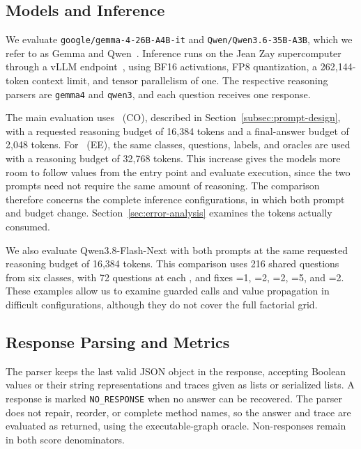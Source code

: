 \subsection{Models and Inference}
\label{subsec:model-configurations}

We evaluate \texttt{google/gemma-4-26B-A4B-it} and \texttt{Qwen/Qwen3.6-35B-A3B}, which we refer to as Gemma and Qwen~\cite{google2026gemma4,qwen2026qwen36}. Inference runs on the Jean Zay supercomputer through a vLLM endpoint~\cite{kwon2023vllm}, using BF16 activations, FP8 quantization, a 262,144-token context limit, and tensor parallelism of one. The respective reasoning parsers are \texttt{gemma4} and \texttt{qwen3}, and each question receives one response.

The main evaluation uses \benchmark~(CO), described in Section~\ref{subsec:prompt-design}, with a requested reasoning budget of 16,384 tokens and a final-answer budget of 2,048 tokens. For \benchmark~(EE), the same classes, questions, labels, and oracles are used with a reasoning budget of 32,768 tokens. This increase gives the models more room to follow values from the entry point and evaluate execution, since the two prompts need not require the same amount of reasoning. The comparison therefore concerns the complete inference configurations, in which both prompt and budget change. Section~\ref{sec:error-analysis} examines the tokens actually consumed.

We also evaluate Qwen3.8-Flash-Next with both prompts at the same requested reasoning budget of 16,384 tokens. This comparison uses 216 shared questions from six classes, with 72 questions at each , and fixes =1, =2, =2, =5, and =2. These examples allow us to examine guarded calls and value propagation in difficult configurations, although they do not cover the full factorial grid.

\subsection{Response Parsing and Metrics}
\label{subsec:parsing}
\label{subsec:scoring}
\label{subsec:statistical-analysis}

The parser keeps the last valid JSON object in the response, accepting Boolean values or their string representations and traces given as lists or serialized lists. A response is marked \texttt{NO\_RESPONSE} when no answer can be recovered. The parser does not repair, reorder, or complete method names, so the answer and trace are evaluated as returned, using the executable-graph oracle. Non-responses remain in both score denominators.

